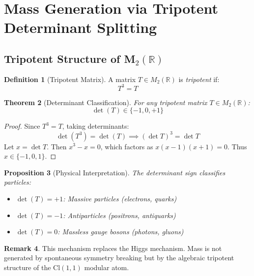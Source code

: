 \documentclass[12pt,a4paper]{article}
\newtheorem{theorem}{Theorem}[section]
\newtheorem{proposition}[theorem]{Proposition}
\theoremstyle{definition}
\newtheorem{definition}[theorem]{Definition}
\newtheorem{remark}[theorem]{Remark}
\theoremstyle{axiom}
\newcommand{\Cl}{\text{Cl}}
\begin{document}
\newpage

\section{Mass Generation via Tripotent Determinant Splitting}

\subsection{Tripotent Structure of M$_2(\mathbb{R})$}

\begin{definition}[Tripotent Matrix]
A matrix $T \in M_2(\mathbb{R})$ is \textit{tripotent} if:
\begin{equation}
T^3 = T
\end{equation}
\end{definition}

\begin{theorem}[Determinant Classification]\label{thm:tripotent_det}
For any tripotent matrix $T \in M_2(\mathbb{R})$:
\begin{equation}
\det(T) \in \{-1, 0, +1\}
\end{equation}
\end{theorem}

\begin{proof}
Since $T^3 = T$, taking determinants:
\begin{equation}
\det(T^3) = \det(T) \implies (\det T)^3 = \det T
\end{equation}
Let $x = \det T$. Then $x^3 - x = 0$, which factors as $x(x-1)(x+1) = 0$. Thus $x \in \{-1, 0, 1\}$.
\end{proof}

\begin{proposition}[Physical Interpretation]
The determinant sign classifies particles:
\begin{itemize}
\item $\det(T) = +1$: Massive particles (electrons, quarks)
\item $\det(T) = -1$: Antiparticles (positrons, antiquarks)
\item $\det(T) = 0$: Massless gauge bosons (photons, gluons)
\end{itemize}
\end{proposition}

\begin{remark}
This mechanism replaces the Higgs mechanism. Mass is not generated by spontaneous symmetry breaking but by the algebraic tripotent structure of the $\Cl(1,1)$ modular atom.
\end{remark}
\end{document}
